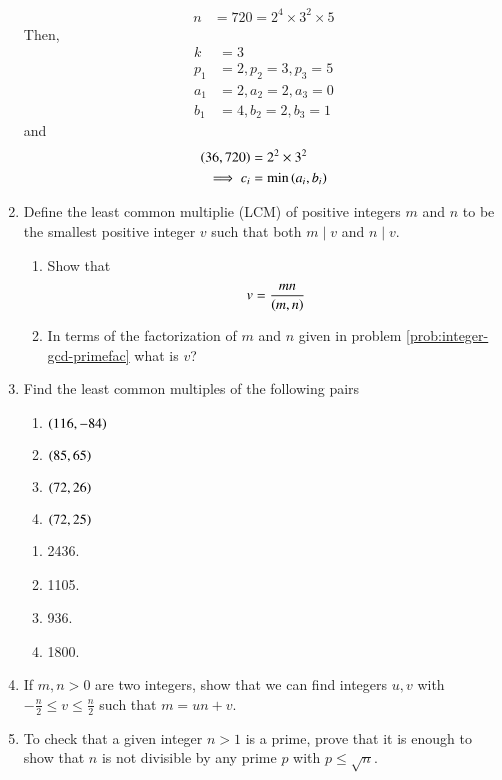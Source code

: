 \begin{enumerate}[label=\arabic*.,ref=\thesubsection.\theenumi]
\begin{align}
\\
	n&=720 = 2^4\times 3^2 \times 5
\end{align}
Then, 
\begin{align}
	k &= 3
	\\
	p_1 &= 2, p_2 = 3, p_3 = 5
	\\
	a_1 &= 2, a_2 = 2, a_3 =0 
	\\
	b_1 &= 4, b_2 = 2, b_3 = 1
\end{align}
and 
\begin{align}
	\left(36,720\right) &= 2^2\times 3^2
	\\
	\implies c_i &= \min\left(a_i, b_i\right)
\end{align}
\item Define the least common multiplie (LCM) of positive integers $m$ and $n$ to be the smallest positive integer 
$v$ such that both $m \mid v$ and $n \mid v$.
\begin{enumerate}
	\item 
Show that
		\begin{align}
			v = \frac{mn}{\left(m,n\right)}
		\end{align}
	\item In terms of the factorization of $m$ and $n$ given in problem 
\ref{prob:integer-gcd-primefac}
what is $v$?
\end{enumerate}
\item  Find the least common multiples of the following pairs
\begin{enumerate}
	\item $\left(116,-84\right)$
	\item $\left(85,65\right)$
	\item $\left(72,26\right)$
	\item $\left(72, 25\right)$
\end{enumerate}
\solution 
\begin{enumerate}
	\item 2436.
	\item 1105.
	\item 936.
	\item 1800.
\end{enumerate}
\item If $m,n > 0$ are two integers, show that we can find integers $u, v$ with $-\frac{n}{2} \le v \le  \frac{n}{2}$ such that $m = un+v$.
\item To check that a given integer $n > 1$ is a prime, prove that it is enough to show that $n$ is not divisible by any prime $p$ with $p \le \sqrt{n}$.
\end{enumerate}
